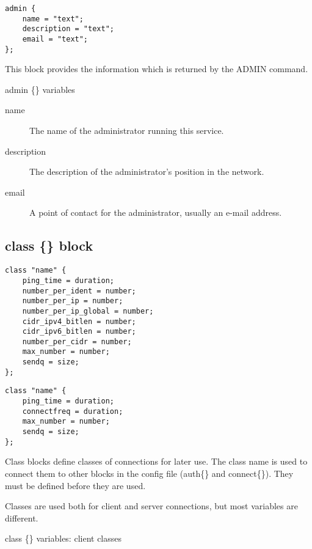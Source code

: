 \begin{verbatim}
admin {
	name = "text";
	description = "text";
	email = "text";
};\end{verbatim}

	This block provides the information which is returned by the ADMIN
	command.


{\sc admin \{\} variables}
\nopagebreak

\noindent
\begin{description}
\item[{name}]
	The name of the administrator running this service.

\item[{description}]
	The description of the administrator's position in the network.

\item[{email}]
	A point of contact for the administrator, usually an e-{}mail address.
\end{description}


\subsection{class \{\} block}

\begin{verbatim}
class "name" {
	ping_time = duration;
	number_per_ident = number;
	number_per_ip = number;
	number_per_ip_global = number;
	cidr_ipv4_bitlen = number;
	cidr_ipv6_bitlen = number;
	number_per_cidr = number;
	max_number = number;
	sendq = size;
};\end{verbatim}

\begin{verbatim}
class "name" {
	ping_time = duration;
	connectfreq = duration;
	max_number = number;
	sendq = size;
};\end{verbatim}

	Class blocks define classes of connections for later use. The class
	name is used to connect them to	other blocks in the config file
	(auth\{\} and connect\{\}). They must be defined before they are used.

	Classes are used both for client and server connections, but most
	variables are different.


{\sc class \{\} variables: client classes}
\nopagebreak

